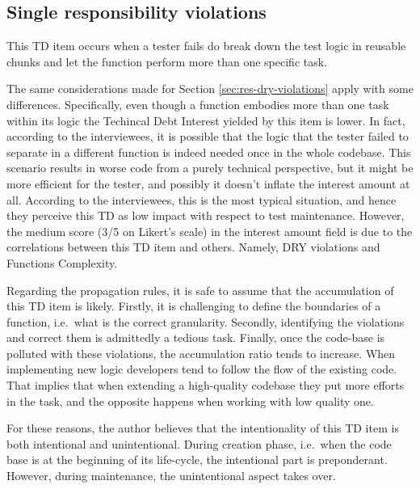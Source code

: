 


    \subsection{Single responsibility violations} \label{sec:res-single-responsability-vilation}

    This TD item occurs when a tester fails do break down the test logic in reusable chunks and let the function perform more than one specific task.

    The same considerations made for Section \ref{sec:res-dry-violations} apply with some differences. Specifically, even though a function embodies more than one task within its logic the Techincal Debt Interest yielded by this item is lower. In fact, according to the interviewees, it is possible that the logic that the tester failed to separate in a different function is indeed needed once in the whole codebase. This scenario results in worse code from a purely technical perspective, but it might be more efficient for the tester, and possibly it doesn't inflate the interest amount at all. According to the interviewees, this is the most typical situation, and hence they perceive this TD as low impact with respect to test maintenance.  \label{sec:disc-rq3-single-responsibility} However, the medium score (3/5 on Likert's scale) in the interest amount field is due to the correlations between this TD item and others. Namely, DRY violations and Functions Complexity.

    Regarding the propagation rules, it is safe to assume that the accumulation of this TD item is likely. Firstly, it is challenging to define the boundaries of a function, i.e.\ what is the correct granularity. Secondly, identifying the violations and correct them is admittedly a tedious task. Finally, once the code-base is polluted with these violations, the accumulation ratio tends to increase. When implementing new logic developers tend to follow the flow of the existing code. That implies that when extending a high-quality codebase they put more efforts in the task, and the opposite happens when working with low quality one.

    For these reasons, the author believes that the intentionality of this TD item is both intentional and unintentional. During creation phase, i.e.\ when the code base is at the beginning of its life-cycle, the intentional part is preponderant. However, during maintenance, the unintentional aspect takes over.


